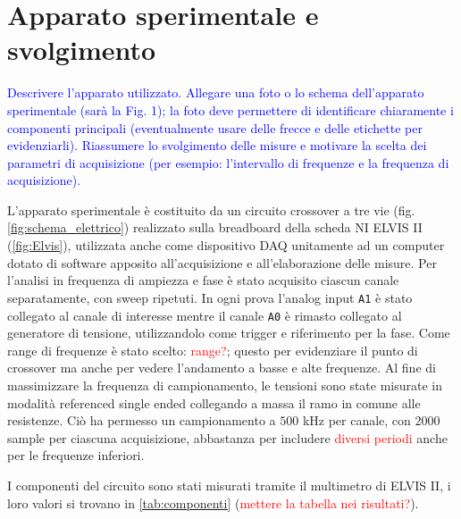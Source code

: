 \documentclass[12pt,italian]{article}
\newcommand{\prof}[1]{\textcolor{blue}{#1}}
\newcommand{\err}[1]{\textcolor{red}{#1}}
\begin{document}
\section*{Apparato sperimentale e svolgimento}
\prof{ Descrivere l'apparato utilizzato. Allegare una foto o lo schema
	dell'apparato sperimentale (sarà la Fig. 1); la foto deve permettere di
	identificare chiaramente i componenti principali (eventualmente usare delle
	frecce e delle etichette per evidenziarli). Riassumere lo svolgimento delle
	misure e motivare la scelta dei parametri di acquisizione (per esempio:
	l'intervallo di frequenze e la frequenza di acquisizione). }

L'apparato sperimentale è costituito da un circuito crossover a tre vie (fig.
\ref{fig:schema_elettrico}) realizzato sulla breadboard della scheda NI ELVIS
II (\cref{fig:Elvis}), utilizzata anche come dispositivo DAQ unitamente ad un
computer dotato di software apposito all'acquisizione e all'elaborazione delle
misure. Per l'analisi in frequenza di ampiezza e fase è stato acquisito ciascun
canale separatamente, con sweep ripetuti. In ogni prova l'analog input
\texttt{A1} è stato collegato al canale di interesse mentre il canale
\texttt{A0} è rimasto collegato al generatore di tensione, utilizzandolo come
trigger e riferimento per la fase. Come range di frequenze è stato scelto:
\err{range?}; questo per evidenziare il punto di crossover ma anche per vedere
l'andamento a basse e alte frequenze. Al fine di massimizzare la frequenza di
campionamento, le tensioni sono state misurate in modalità referenced single
ended collegando a massa il ramo in comune alle resistenze. Ciò ha permesso un
campionamento a $500$ kHz per canale, con $2000$ sample per ciascuna
acquisizione, abbastanza per includere \err{diversi periodi} anche per le
frequenze inferiori.

I componenti del circuito sono stati misurati tramite il multimetro di ELVIS
II, i loro valori si trovano in \cref{tab:componenti} (\err{mettere la tabella
	nei risultati?}).
\end{document}
